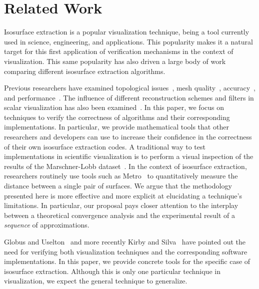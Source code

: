 \section{Related Work}
\label{chap1:sec:prevwork}

Isosurface extraction is a popular visualization technique, being a
tool currently used in science, engineering, and applications.
This popularity makes it a natural target for this first application of
verification mechanisms in the context of visualization.
%
This same popularity has also driven a large body of work
comparing different isosurface extraction algorithms.

Previous researchers have examined topological 
issues~\cite{ning93, Lewiner:2003},
mesh quality~\cite{Dietrich:TVCG:2008,Schreiner06},
accuracy~\cite{patera04,zhou01}, and
performance~\cite{Sutton00acase}. The influence of different reconstruction schemes and 
filters in scalar visualization has also been examined~\cite{Hamish06,Pommert02}.
In this paper, we focus on techniques to verify the correctness of
algorithms and their corresponding implementations. In particular, we
provide mathematical tools that other researchers and developers can
use to increase their confidence in the correctness of their own
isosurface extraction codes.  A traditional way to test
implementations in scientific visualization is to perform a visual
inspection of the results of the Marschner-Lobb
dataset~\cite{marschnerlobb}. In the context of isosurface extraction,
researchers routinely use tools such as Metro~\cite{Cignoni:1998:MET} to
quantitatively measure the distance between a single pair of surfaces.
We argue that the methodology presented here is more effective and more
explicit at elucidating a technique's limitations. In particular, our proposal
pays closer attention to the interplay between a theoretical
convergence analysis and the experimental result of a \emph{sequence} of
approximations.

Globus and Uselton~\cite{globus95} and more recently
Kirby and Silva~\cite{kirby-vv-08} have pointed out the need 
for verifying both visualization techniques and the corresponding
software implementations. In this paper, we provide concrete tools for
the specific case of isosurface extraction. Although this is only one
particular technique in visualization, we expect the general technique
to generalize.


